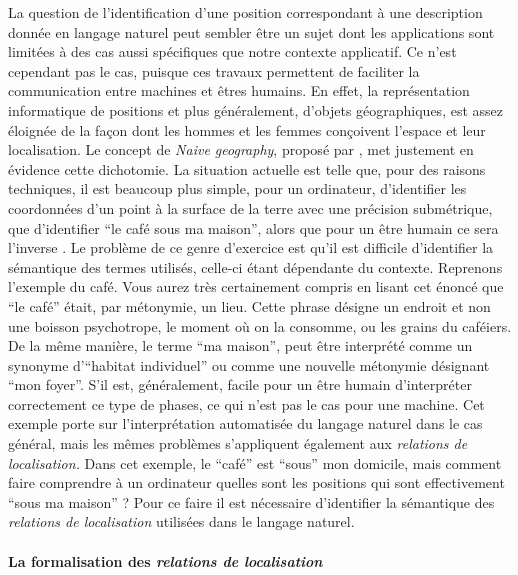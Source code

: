 La question de l’identification d'une position correspondant à une
description donnée en langage naturel peut sembler être un sujet dont
les applications sont limitées à des cas aussi spécifiques que notre
contexte applicatif. Ce n'est cependant pas le cas, puisque ces
travaux permettent de faciliter la communication entre machines et
êtres humains. En effet, la représentation informatique de positions
et plus généralement, d'objets géographiques, est assez éloignée de la
façon dont les hommes et les femmes conçoivent l'espace et leur
localisation.  Le concept de \emph{Naive geography}, proposé par
\textcite{Egenhofer1995}, met justement en évidence cette dichotomie.
%
La situation actuelle est telle que, pour des raisons techniques, il
est beaucoup plus simple, pour un ordinateur, d'identifier les
coordonnées d'un point à la surface de la terre avec une précision
submétrique, que d'identifier \enquote{le café sous ma maison}, alors
que pour un être humain ce sera l'inverse \autocite{Duchene2019}. Le
problème de ce genre d'exercice est qu'il est difficile d'identifier
la sémantique des termes utilisés, celle-ci étant dépendante du
contexte. Reprenons l'exemple du café. Vous aurez très certainement
compris en lisant cet énoncé que \enquote{le café} était, par
métonymie, un lieu. Cette phrase désigne un endroit et non une boisson
psychotrope, le moment où on la consomme, ou les grains du
caféiers. De la même manière, le terme \enquote{ma maison}, peut être
interprété comme un synonyme d'\enquote{habitat individuel} ou comme
une nouvelle métonymie désignant \enquote{mon foyer}. S'il est,
généralement, facile pour un être humain d'interpréter correctement ce
type de phases, ce qui n'est pas le cas pour une machine.
%
Cet exemple porte sur l'interprétation automatisée du langage naturel
dans le cas général, mais les mêmes problèmes s'appliquent également
aux \emph{relations de localisation.} Dans cet exemple, le
\enquote{café} est \enquote{sous} mon domicile, mais comment faire
comprendre à un ordinateur quelles sont les positions qui sont
effectivement \enquote{sous ma maison} ? Pour ce faire il est
nécessaire d'identifier la sémantique des \emph{relations de
  localisation} utilisées dans le langage naturel.

\paragraph{La formalisation des \emph{relations de localisation}}

